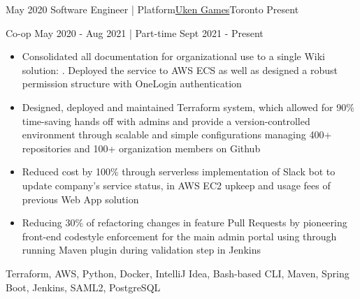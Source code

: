 %
%
%
\begin{experiences}
  \experience
    {May 2020}   {Software Engineer | Platform}{\href{https://uken.com}{Uken Games}}{Toronto}
    {Present} {
                    Co-op May 2020 - Aug 2021 | Part-time Sept 2021 - Present
                    \begin{itemize}
                        \item Consolidated all documentation for organizational use to a single Wiki solution: . Deployed the service to AWS ECS as well as designed a robust permission structure with OneLogin authentication 
                        
                        \item Designed, deployed and maintained Terraform system, which allowed for 90\% time-saving hands off with admins and provide a version-controlled environment through scalable and simple configurations managing 400+ repositories and 100+ organization members on Github
                        
                        \item Reduced cost by 100\% through serverless implementation of Slack bot to update company's service status, in AWS EC2 upkeep and usage fees of previous Web App solution
                        
                        \item Reducing 30\% of refactoring changes in feature Pull Requests by pioneering front-end codestyle enforcement for the main admin portal using   through running Maven plugin during validation step in Jenkins
                    \end{itemize}
                    }
                    {Terraform, AWS, Python, Docker, IntelliJ Idea, Bash-based CLI, Maven, Spring Boot, Jenkins, SAML2, PostgreSQL}
\end{experiences}
